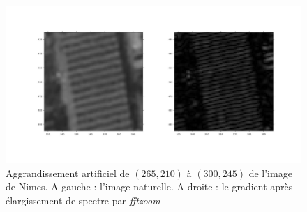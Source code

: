 \documentclass[12pt,a4paper,onecolumn]{article}
\begin{document}
\begin{figure}[H]
	\begin{center}
		\includegraphics[width = \textwidth]{ex5_q3_solution.jpg}
	\end{center}
	\caption{Aggrandissement artificiel de $(265, 210)$ à $(300, 245)$ de l'image de Nimes. A gauche : l'image naturelle. A droite : le gradient après élargissement de spectre par \textit{fftzoom}}
	\label{ex5_q3_sol}
\end{figure}
\end{document}
